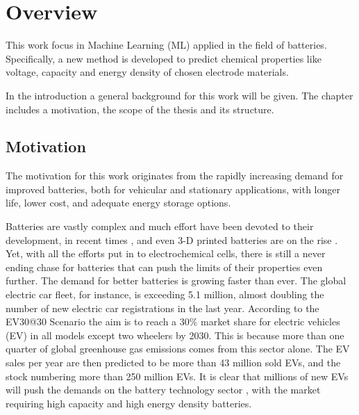 \section{Overview}

	This work focus in Machine Learning (\ac{ML}) applied in the field of batteries. Specifically, a new method is developed to predict chemical properties like voltage, capacity and energy density of chosen electrode materials.

	In the introduction a general background for this work will be given. The chapter includes a motivation, the scope of the thesis and its structure. 
 

\subsection{Motivation}\label{sec:motivation}

The motivation for this work originates from the rapidly increasing demand for improved batteries, both for vehicular and stationary applications, with longer life, lower cost, and adequate energy storage options.





Batteries are vastly complex and much effort have been devoted to their development, in recent times \cite{blomgren2016development} \cite{hosaka2020research} \cite{cao2020batteries}, and even 3-D printed batteries are on the rise \cite{pang2020additive}. Yet, with all the efforts put in to electrochemical cells, there is still a never ending chase for batteries that can push the limits of their properties even further. The demand for better batteries is growing faster than ever. The global electric car fleet, for instance, is exceeding 5.1 million, almost doubling the number of new electric car registrations in the last year. According to the EV30@30 Scenario \cite{international2018global} the aim is to reach a $30\%$ market share for electric vehicles (\ac{EV}) in all models except two wheelers by 2030. This is because more than one quarter of global greenhouse gas emissions comes from this sector alone. The EV sales per year are then predicted to be more than 43 million sold EVs, and the stock numbering more than 250 million EVs. It is clear that millions of new EVs will push the demands on the battery technology sector \cite{xiong2020overview}, with the market requiring high capacity and high energy density batteries. 


